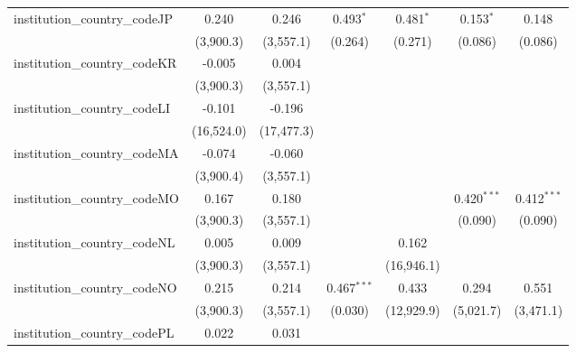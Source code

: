 \begin{tabular}{lcccccc}
   institution\_country\_codeJP          & 0.240          & 0.246          & 0.493$^{*}$   & 0.481$^{*}$   & 0.153$^{*}$    & 0.148\\   
                                         & (3,900.3)      & (3,557.1)      & (0.264)       & (0.271)       & (0.086)        & (0.086)\\   
   institution\_country\_codeKR          & -0.005         & 0.004          &               &               &                &   \\   
                                         & (3,900.3)      & (3,557.1)      &               &               &                &   \\   
   institution\_country\_codeLI          & -0.101         & -0.196         &               &               &                &   \\   
                                         & (16,524.0)     & (17,477.3)     &               &               &                &   \\   
   institution\_country\_codeMA          & -0.074         & -0.060         &               &               &                &   \\   
                                         & (3,900.4)      & (3,557.1)      &               &               &                &   \\   
   institution\_country\_codeMO          & 0.167          & 0.180          &               &               & 0.420$^{***}$  & 0.412$^{***}$\\   
                                         & (3,900.3)      & (3,557.1)      &               &               & (0.090)        & (0.090)\\   
   institution\_country\_codeNL          & 0.005          & 0.009          &               & 0.162         &                &   \\   
                                         & (3,900.3)      & (3,557.1)      &               & (16,946.1)    &                &   \\   
   institution\_country\_codeNO          & 0.215          & 0.214          & 0.467$^{***}$ & 0.433         & 0.294          & 0.551\\   
                                         & (3,900.3)      & (3,557.1)      & (0.030)       & (12,929.9)    & (5,021.7)      & (3,471.1)\\   
   institution\_country\_codePL          & 0.022          & 0.031          &               &               &                &   \\   

\end{tabular}
